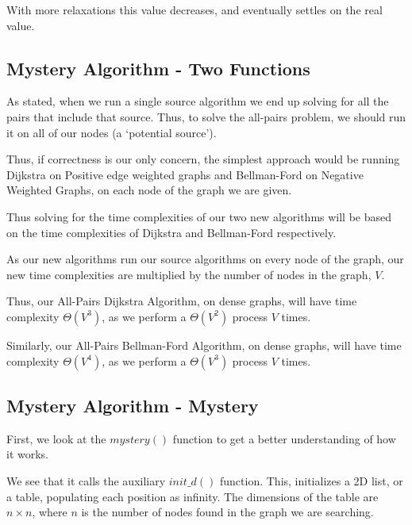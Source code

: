 \documentclass{article}
\begin{document}
With more relaxations this value decreases, and eventually settles on the real value.


\subsection{Mystery Algorithm - Two Functions}

As stated, when we run a single source algorithm we end up solving for all the pairs that include that source. Thus, to solve the all-pairs problem, we should run it on all of our nodes (a `potential source').

Thus, if correctness is our only concern, the simplest approach would be running Dijkstra on Positive edge weighted graphs and Bellman-Ford on Negative Weighted Graphs,
on each node of the graph we are given.

Thus solving for the time complexities of our two new algorithms will be based on the time complexities of Dijkstra and Bellman-Ford respectively.

As our new algorithms run our source algorithms on every node of the graph, our new time complexities are multiplied by the number of nodes in the graph, $V$.

Thus, our All-Pairs Dijkstra Algorithm, on dense graphs, will have time complexity $\Theta(V^3)$, as we perform a $\Theta(V^2)$ process $V$ times.

Similarly, our All-Pairs Bellman-Ford Algorithm, on dense graphs, will have time complexity $\Theta(V^4)$, as we perform a $\Theta(V^3)$ process $V$ times.

\subsection{Mystery Algorithm - Mystery}

First, we look at the $mystery()$ function to get a better understanding of how it works.

We see that it calls the auxiliary $init\_d()$ function. This, initializes a 2D list, or a table, populating each position as infinity. The dimensions of the table are $n \times n$, where $n$ is the number of nodes found in the graph we are searching.
\end{document}
